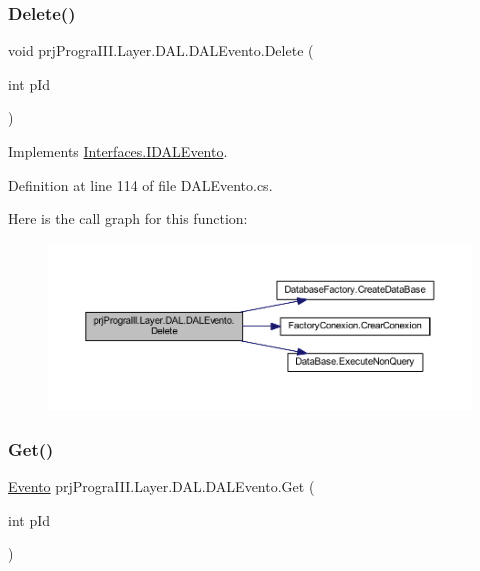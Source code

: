 \subsubsection{\texorpdfstring{Delete()}{Delete()}}
{\footnotesize\ttfamily void prj\+Progra\+I\+I\+I.\+Layer.\+D\+A\+L.\+D\+A\+L\+Evento.\+Delete (\begin{DoxyParamCaption}\item[{int}]{p\+Id }\end{DoxyParamCaption})}



Implements \hyperlink{interface_interfaces_1_1_i_d_a_l_evento_a8d651965fc1b755f5409a8f05fc293c3}{Interfaces.\+I\+D\+A\+L\+Evento}.



Definition at line 114 of file D\+A\+L\+Evento.\+cs.

Here is the call graph for this function\+:
\nopagebreak
\begin{figure}[H]
\begin{center}
\leavevmode
\includegraphics[width=350pt]{classprj_progra_i_i_i_1_1_layer_1_1_d_a_l_1_1_d_a_l_evento_a269652e78dd2e186b0b330c250a90cda_cgraph}
\end{center}
\end{figure}
\hypertarget{classprj_progra_i_i_i_1_1_layer_1_1_d_a_l_1_1_d_a_l_evento_aaaa8b7f305fa6367d39bc53308d96aec}{}\label{classprj_progra_i_i_i_1_1_layer_1_1_d_a_l_1_1_d_a_l_evento_aaaa8b7f305fa6367d39bc53308d96aec} 
\subsubsection{\texorpdfstring{Get()}{Get()}}
{\footnotesize\ttfamily \hyperlink{classprj_progra_i_i_i_1_1_layer_1_1_entities_1_1_evento}{Evento} prj\+Progra\+I\+I\+I.\+Layer.\+D\+A\+L.\+D\+A\+L\+Evento.\+Get (\begin{DoxyParamCaption}\item[{int}]{p\+Id }\end{DoxyParamCaption})}



